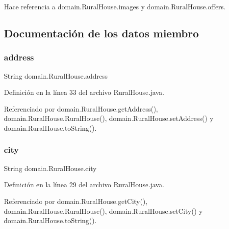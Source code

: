 Hace referencia a domain.\+Rural\+House.\+images y domain.\+Rural\+House.\+offers.



\subsection{Documentación de los datos miembro}
\mbox{\label{classdomain_1_1_rural_house_a6ba346c74cb3404ca6d04a2ebae730d3}} 
\subsubsection{\texorpdfstring{address}{address}}
{\footnotesize\ttfamily String domain.\+Rural\+House.\+address\hspace{0.3cm}{\ttfamily [private]}}



Definición en la línea 33 del archivo Rural\+House.\+java.



Referenciado por domain.\+Rural\+House.\+get\+Address(), domain.\+Rural\+House.\+Rural\+House(), domain.\+Rural\+House.\+set\+Address() y domain.\+Rural\+House.\+to\+String().

\mbox{\label{classdomain_1_1_rural_house_a4ac1bd1de58f97487abbcb8dc27a8077}} 
\subsubsection{\texorpdfstring{city}{city}}
{\footnotesize\ttfamily String domain.\+Rural\+House.\+city\hspace{0.3cm}{\ttfamily [private]}}



Definición en la línea 29 del archivo Rural\+House.\+java.



Referenciado por domain.\+Rural\+House.\+get\+City(), domain.\+Rural\+House.\+Rural\+House(), domain.\+Rural\+House.\+set\+City() y domain.\+Rural\+House.\+to\+String().

\mbox{\label{classdomain_1_1_rural_house_afdc9d7b70bcc6baa94cae033a5684f0e}} 
